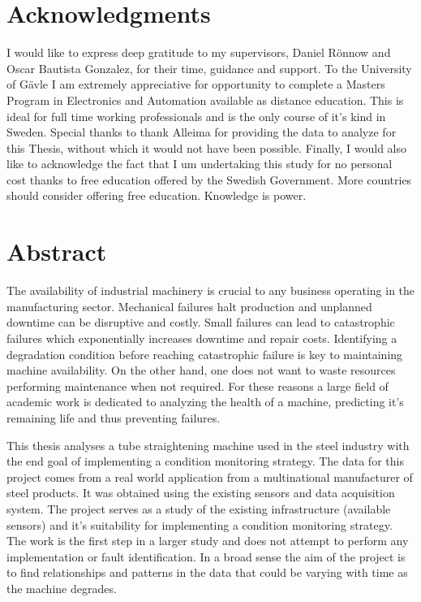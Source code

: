 \documentclass[]{article}
\begin{document}
\setmainfont{Perpetua}

\newpage
\thispagestyle{empty}
\mbox{}
\newpage
{}

\section*{Acknowledgments}
I would like to express deep gratitude to my supervisors, Daniel Rönnow and Oscar Bautista Gonzalez, for their time, guidance and support. To the University of Gävle I am extremely appreciative for opportunity to complete a Masters Program in Electronics and Automation available as distance education. This is ideal for full time working professionals and is the only course of it's kind in Sweden. Special thanks to thank Alleima for providing the data to analyze for this Thesis, without which it would not have been possible. Finally, I would also like to acknowledge the fact that I um undertaking this study for no personal cost thanks to free education offered by the Swedish Government. More countries should consider offering free education. Knowledge is power.
\newpage

\section*{Abstract}
The availability of industrial machinery is crucial to any business operating in the manufacturing sector. Mechanical failures halt production and unplanned downtime can be disruptive and costly. Small failures can lead to catastrophic failures which exponentially increases downtime and repair costs. Identifying a degradation condition before reaching catastrophic failure is key to maintaining machine availability. On the other hand, one does not want to waste resources performing maintenance when not required. For these reasons a large field of academic work is dedicated to analyzing the health of a machine, predicting it's remaining life and thus preventing failures.

This thesis analyses a tube straightening machine used in the steel industry with the end goal of implementing a condition monitoring strategy. The data for this project comes from a real world application from a multinational manufacturer of steel products. It was obtained using the existing sensors and data acquisition system. The project serves as a study of the existing infrastructure (available sensors) and it's suitability for implementing a condition monitoring strategy. The work is the first step in a larger study and does not attempt to perform any implementation or fault identification. In a broad sense the aim of the project is to find relationships and patterns in the data that could be varying with time as the machine degrades.
\end{document}
